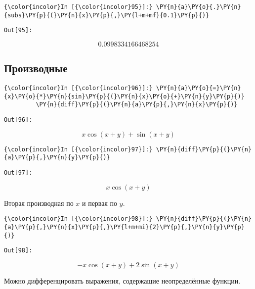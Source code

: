    \begin{Verbatim}[commandchars=\\\{\}]
{\color{incolor}In [{\color{incolor}95}]:} \PY{n}{a}\PY{o}{.}\PY{n}{subs}\PY{p}{(}\PY{n}{x}\PY{p}{,}\PY{l+m+mf}{0.1}\PY{p}{)}
\end{Verbatim}
\texttt{\color{outcolor}Out[{\color{outcolor}95}]:}
    
    \[0.0998334166468254\]

    

\subsection{Производные}
\label{sympy07}

    \begin{Verbatim}[commandchars=\\\{\}]
{\color{incolor}In [{\color{incolor}96}]:} \PY{n}{a}\PY{o}{=}\PY{n}{x}\PY{o}{*}\PY{n}{sin}\PY{p}{(}\PY{n}{x}\PY{o}{+}\PY{n}{y}\PY{p}{)}
         \PY{n}{diff}\PY{p}{(}\PY{n}{a}\PY{p}{,}\PY{n}{x}\PY{p}{)}
\end{Verbatim}
\texttt{\color{outcolor}Out[{\color{outcolor}96}]:}
    
    \[x \cos{\left (x + y \right )} + \sin{\left (x + y \right )}\]

    

    \begin{Verbatim}[commandchars=\\\{\}]
{\color{incolor}In [{\color{incolor}97}]:} \PY{n}{diff}\PY{p}{(}\PY{n}{a}\PY{p}{,}\PY{n}{y}\PY{p}{)}
\end{Verbatim}
\texttt{\color{outcolor}Out[{\color{outcolor}97}]:}
    
    \[x \cos{\left (x + y \right )}\]

    

    Вторая производная по \(x\) и первая по \(y\).

    \begin{Verbatim}[commandchars=\\\{\}]
{\color{incolor}In [{\color{incolor}98}]:} \PY{n}{diff}\PY{p}{(}\PY{n}{a}\PY{p}{,}\PY{n}{x}\PY{p}{,}\PY{l+m+mi}{2}\PY{p}{,}\PY{n}{y}\PY{p}{)}
\end{Verbatim}
\texttt{\color{outcolor}Out[{\color{outcolor}98}]:}
    
    \[- x \cos{\left (x + y \right )} + 2 \sin{\left (x + y \right )}\]

    

    Можно дифференцировать выражения, содержащие неопределённые функции.

